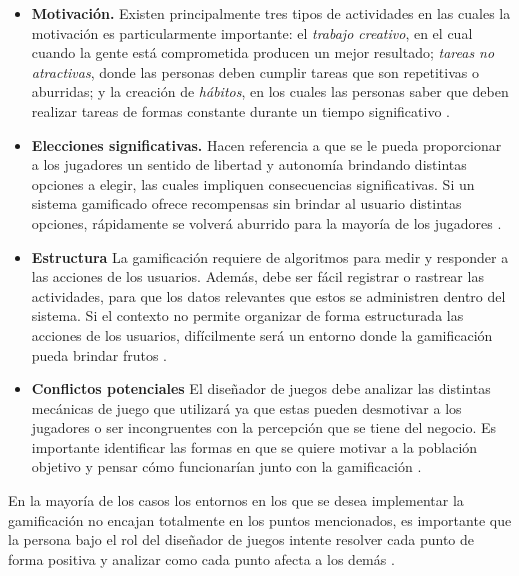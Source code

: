     \begin{itemize}
    \item
    {\bf Motivación.}
        Existen principalmente tres tipos de actividades en las cuales la motivación
        es particularmente importante: el {\em trabajo creativo}, en el cual cuando la gente
        está comprometida producen un mejor resultado; {\em tareas no atractivas}, donde las
        personas deben cumplir tareas que son repetitivas o aburridas; y la creación de
        {\em hábitos}, en los cuales las personas saber que deben realizar tareas de formas
        constante durante un tiempo significativo \cite[p. 31]{ForTheWin}.
        \clearpage

    \item
    {\bf Elecciones significativas.}
        Hacen referencia a que se le pueda proporcionar a los jugadores un sentido de libertad
        y autonomía brindando distintas opciones a elegir, las cuales impliquen consecuencias
        significativas. Si un sistema gamificado ofrece recompensas sin brindar al usuario
        distintas opciones, rápidamente se volverá aburrido para la mayoría de los jugadores
        \cite[p. 32]{ForTheWin}.

    \item {\bf Estructura}
        La gamificación requiere de algoritmos para medir y responder a las acciones de los
        usuarios. Además, debe ser fácil registrar o rastrear las actividades, para que los
        datos relevantes que estos se administren dentro del sistema. Si el contexto no permite
        organizar de forma estructurada las acciones de los usuarios, difícilmente será un
        entorno donde la gamificación pueda brindar frutos \cite[p. 32]{ForTheWin}.

    \item {\bf Conflictos potenciales}
        El diseñador de juegos debe analizar las distintas mecánicas de juego que utilizará
        ya que estas pueden desmotivar a los jugadores o ser incongruentes con la percepción
        que se tiene del negocio. Es importante identificar las formas en que se quiere motivar
        a la población objetivo y pensar cómo funcionarían junto con la gamificación
        \cite[p. 33]{ForTheWin}.

    \end{itemize}


    \noindent En la mayoría de los casos los entornos en los que se desea implementar la gamificación
    no encajan totalmente en los puntos mencionados, es importante que la persona bajo el rol del
    diseñador de juegos intente resolver cada punto de forma positiva y analizar como cada punto
    afecta a los demás \cite[p. 34]{ForTheWin}.



